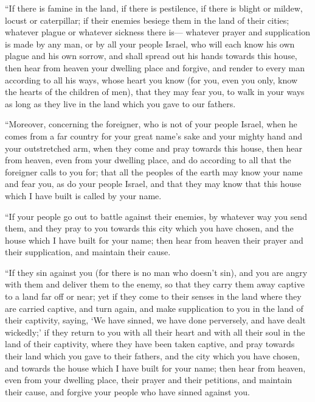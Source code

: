  ``If there is famine in the land, if there is
pestilence, if there is blight or mildew, locust or caterpillar; if
their enemies besiege them in the land of their cities; whatever plague
or whatever sickness there is---  whatever prayer and
supplication is made by any man, or by all your people Israel, who will
each know his own plague and his own sorrow, and shall spread out his
hands towards this house,  then hear from heaven your
dwelling place and forgive, and render to every man according to all his
ways, whose heart you know (for you, even you only, know the hearts of
the children of men),  that they may fear you, to walk in
your ways as long as they live in the land which you gave to our
fathers.

 ``Moreover, concerning the foreigner, who is not of your
people Israel, when he comes from a far country for your great name's
sake and your mighty hand and your outstretched arm, when they come and
pray towards this house,  then hear from heaven, even
from your dwelling place, and do according to all that the foreigner
calls to you for; that all the peoples of the earth may know your name
and fear you, as do your people Israel, and that they may know that this
house which I have built is called by your name.

 ``If your people go out to battle against their enemies,
by whatever way you send them, and they pray to you towards this city
which you have chosen, and the house which I have built for your name;
 then hear from heaven their prayer and their
supplication, and maintain their cause.

 ``If they sin against you (for there is no man who
doesn't sin), and you are angry with them and deliver them to the enemy,
so that they carry them away captive to a land far off or near;
 yet if they come to their senses in the land where they
are carried captive, and turn again, and make supplication to you in the
land of their captivity, saying, `We have sinned, we have done
perversely, and have dealt wickedly;'  if they return to
you with all their heart and with all their soul in the land of their
captivity, where they have been taken captive, and pray towards their
land which you gave to their fathers, and the city which you have
chosen, and towards the house which I have built for your name;
 then hear from heaven, even from your dwelling place,
their prayer and their petitions, and maintain their cause, and forgive
your people who have sinned against you.

